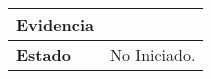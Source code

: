 \begin{longtable}{|p{4cm}|p{9.5cm}|}
\hline
\textbf{Evidencia}                                                                              &                                                                                                                                                                                                                                                                                                                             \\ 
\hline
\textbf{Estado}                                                                                 & No Iniciado.                                                                                                                                                                                                                                                                                                                \\
\hline
\end{longtable}
